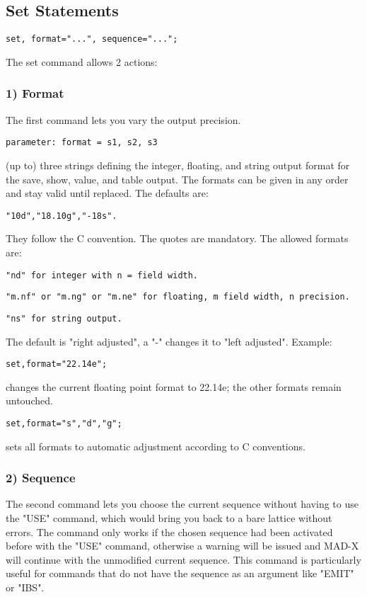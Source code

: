 
\subsection{Set Statements}

\begin{verbatim}
set, format="...", sequence="...";
\end{verbatim} 

The set command allows 2 actions: 

\subsubsection{1) Format} 
The first command lets you vary the output precision. 
\begin{verbatim}
parameter: format = s1, s2, s3
\end{verbatim} 
(up to) three strings defining the integer, floating, and string output
format for the save, show, value, and table output. The formats can be
given in any order and stay valid until replaced. The defaults are:  
\begin{verbatim}
"10d","18.10g","-18s".
\end{verbatim} 
They follow the C convention. The quotes are mandatory. The allowed formats are: 
\begin{verbatim}
"nd" for integer with n = field width.
\end{verbatim}
\begin{verbatim}
"m.nf" or "m.ng" or "m.ne" for floating, m field width, n precision.
\end{verbatim}
\begin{verbatim}
"ns" for string output.
\end{verbatim} 
The default is "right adjusted", a "-" changes it to "left adjusted".  Example: 
\begin{verbatim}
set,format="22.14e";
\end{verbatim} 
changes the current floating point format to 22.14e; the other formats remain untouched. 
\begin{verbatim}
set,format="s","d","g";
\end{verbatim} 
sets all formats to automatic adjustment according to C conventions. 

\subsubsection{2) Sequence} The second command lets you choose the
current sequence without having to use the "USE" command, which would
bring you back to a bare lattice without errors. The command only works
if the chosen sequence had been activated before with the "USE" command,
otherwise a warning will be issued and MAD-X will continue with the
unmodified current sequence. This command is particularly useful for
commands that do not have the sequence as an argument like "EMIT" or
"IBS". 


